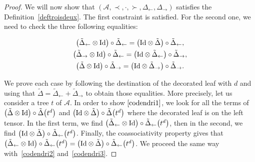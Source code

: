 \documentclass[10pt,a4paper]{amsart}
\numberwithin{equation}{section}
\theoremstyle{definition}
\theoremstyle{plain}
\begin{document}
\begin{proof}
	We will now show that $(\mathcal{A},\prec,\cdot,\succ,\Delta_{\leftarrow},\Delta_{\rightarrow})$ satisfies the Definition~\ref{deftroisdeux}.
	The first constraint is satisfied.
	For the second one, we need to check the three following equalities:{\samepage
	\begin{gather}
		\big(\tilde{\Delta}_{\leftarrow}\otimes {\rm Id}\big)\circ \tilde{\Delta}_{\leftarrow}=\big({\rm Id}\otimes \tilde{\Delta}\big)\circ \tilde{\Delta}_{\leftarrow}, \label{codendri1} \\
		\big(\tilde{\Delta}_{\rightarrow}\otimes {\rm Id}\big)\circ \tilde{\Delta}_{\leftarrow}=\big({\rm Id} \otimes \tilde{\Delta}_{\leftarrow}\big)\circ \tilde{\Delta}_{\rightarrow}, \label{codendri2} \\
		\big(\tilde{\Delta}\otimes {\rm Id}\big)\circ \tilde{\Delta}_{\rightarrow}=\big({\rm Id}\otimes \tilde{\Delta}_{\rightarrow}\big)\circ \tilde{\Delta}_{\rightarrow}. \label{codendri3}
	\end{gather}

}\pagebreak

\noindent
	We prove each case by following the destination of the decorated leaf with $d$ and using that $\tilde{\Delta}=\tilde{\Delta}_{\leftarrow}+\tilde{\Delta}_{\rightarrow}$ to obtain those equalities.
	More precisely, let us consider a tree $t$ of $\mathcal{A}$. In order to show $\eqref{codendri1}$, we look for all the terms of $\big(\tilde{\Delta}\otimes {\rm Id}\big)\circ \tilde{\Delta}\big(t^d\big)$ and $\big({\rm Id}\otimes \tilde{\Delta}\big)\circ \tilde{\Delta}\big(t^d\big)$
	where the decorated leaf is on the left tensor. In the first term, we find $\big(\tilde{\Delta}_{\leftarrow}\otimes {\rm Id}\big)\circ \tilde{\Delta}_{\leftarrow}\big(t^d\big)$, then in the second, we find $\big({\rm Id}\otimes \tilde{\Delta}\big)\circ \tilde{\Delta}_{\leftarrow}\big(t^d\big)$.
	Finally, the coassociativity property gives that $\big(\tilde{\Delta}_{\leftarrow}\otimes {\rm Id}\big)\circ \tilde{\Delta}_{\leftarrow}\big(t^d\big)=\big({\rm Id}\otimes \tilde{\Delta}\big)\circ \tilde{\Delta}_{\leftarrow}\big(t^d\big)$.
	We proceed the same way with~\eqref{codendri2} and~\eqref{codendri3}.
	

\end{proof}
\end{document}
